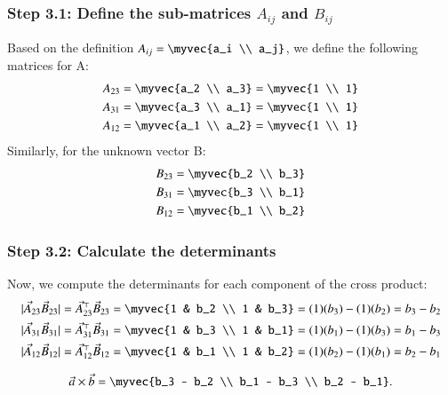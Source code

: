 \documentclass[journal]{IEEEtran}
\numberwithin{equation}{enumi}
\numberwithin{figure}{enumi}
\begin{document}
\subsubsection*{Step 3.1: Define the sub-matrices $A_{ij}$ and $B_{ij}$}
Based on the definition $A_{ij} = \myvec{a_i \\ a_j}$, we define the following matrices for A:
\begin{align}
A_{23} = \myvec{a_2 \\ a_3} = \myvec{1 \\ 1}\\
A_{31} = \myvec{a_3 \\ a_1} = \myvec{1 \\ 1}\\
A_{12} = \myvec{a_1 \\ a_2} = \myvec{1 \\ 1}
\end{align}
Similarly, for the unknown vector B:
\begin{align}
B_{23} = \myvec{b_2 \\ b_3}\\
B_{31} = \myvec{b_3 \\ b_1}\\
B_{12} = \myvec{b_1 \\ b_2}
\end{align}

\subsubsection*{Step 3.2: Calculate the determinants}
Now, we compute the determinants for each component of the cross product:
\begin{align}
	|\vec{A}_{23}\vec{B}_{23}| 
	&= \vec{A}_{23}^\top \vec{B}_{23} 
	= \myvec{1 & b_2 \\ 1 & b_3} 
	= (1)(b_3) - (1)(b_2) 
	= b_3 - b_2 \\	
	|\vec{A}_{31}\vec{B}_{31}| 
	&= \vec{A}_{31}^\top \vec{B}_{31} 
	= \myvec{1 & b_3 \\ 1 & b_1} 
	= (1)(b_1) - (1)(b_3) 
	= b_1 - b_3 \\
	|\vec{A}_{12}\vec{B}_{12}| 
	&= \vec{A}_{12}^\top \vec{B}_{12} 
	= \myvec{1 & b_1 \\ 1 & b_2} 
	= (1)(b_2) - (1)(b_1) 
	= b_2 - b_1 
\end{align}

\begin{align}
\vec{a} \times \vec{b} = \myvec{b_3 - b_2 \\ b_1 - b_3 \\ b_2 - b_1}.
\end{align}
\end{document}

